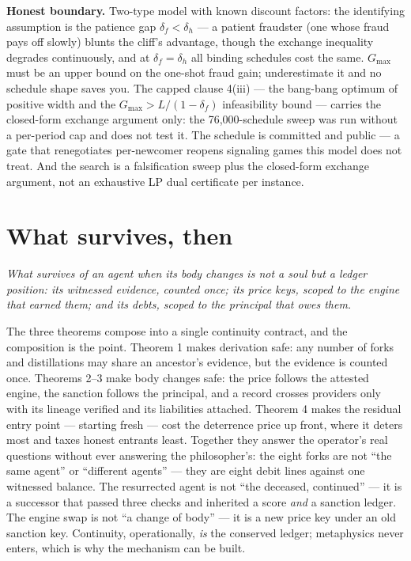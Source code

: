 \documentclass[11pt,a4paper]{article}
\newcommand{\onebreath}[1]{\begin{center}\emph{#1}\end{center}}
\begin{document}
\begin{boundary}
\textbf{Honest boundary.} Two-type model with known discount factors: the identifying assumption is the patience gap
$\delta_f<\delta_h$ --- a patient fraudster (one whose fraud pays off slowly) blunts the cliff's advantage, though the exchange
inequality degrades continuously, and at $\delta_f=\delta_h$ all binding schedules cost the same. $G_{\max}$ must be an upper bound
on the one-shot fraud gain; underestimate it and no schedule shape saves you. The capped clause 4(iii) --- the bang-bang optimum of
positive width and the $G_{\max}>L/(1-\delta_f)$ infeasibility bound --- carries the closed-form exchange argument only: the
76{,}000-schedule sweep was run without a per-period cap and does not test it. The schedule is committed and public --- a gate that
renegotiates per-newcomer reopens signaling games this model does not treat. And the search is a falsification sweep plus the
closed-form exchange argument, not an exhaustive LP dual certificate per instance.
\end{boundary}

\section{What survives, then}\label{sec:survives}

\onebreath{What survives of an agent when its body changes is not a soul but a ledger position: its witnessed evidence, counted
once; its price keys, scoped to the engine that earned them; and its debts, scoped to the principal that owes them.}

The three theorems compose into a single continuity contract, and the composition is the point. Theorem 1 makes derivation safe:
any number of forks and distillations may share an ancestor's evidence, but the evidence is counted once. Theorems 2--3 make body
changes safe: the price follows the attested engine, the sanction follows the principal, and a record crosses providers only with
its lineage verified and its liabilities attached. Theorem 4 makes the residual entry point --- starting fresh --- cost the
deterrence price up front, where it deters most and taxes honest entrants least. Together they answer the operator's real
questions without ever answering the philosopher's: the eight forks are not ``the same agent'' or ``different agents'' --- they are
eight debit lines against one witnessed balance. The resurrected agent is not ``the deceased, continued'' --- it is a successor
that passed three checks and inherited a score \emph{and} a sanction ledger. The engine swap is not ``a change of body'' --- it is
a new price key under an old sanction key. Continuity, operationally, \emph{is} the conserved ledger; metaphysics never enters,
which is why the mechanism can be built.
\end{document}
